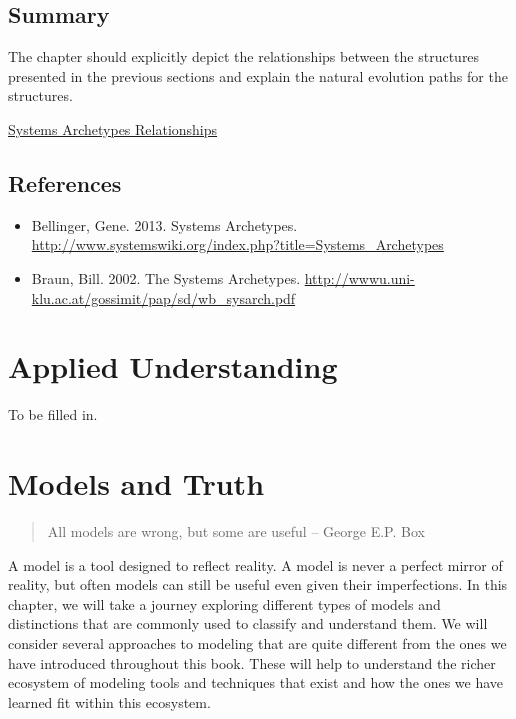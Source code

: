 \documentclass[]{memoir}
\begin{document}
\section{Summary}

The chapter should explicitly depict the relationships between the
structures presented in the previous sections and explain the natural
evolution paths for the structures.

\href{http://insightmaker.com/insight/538}{Systems Archetypes
Relationships}

\section{References}

\begin{itemize}
\itemsep1pt\parskip0pt
\item
  Bellinger, Gene. 2013. Systems Archetypes.
  \url{http://www.systemswiki.org/index.php?title=Systems_Archetypes}
\item
  Braun, Bill. 2002. The Systems Archetypes.
  \url{http://wwwu.uni-klu.ac.at/gossimit/pap/sd/wb_sysarch.pdf}
\end{itemize}

\chapter{Applied Understanding}

To be filled in.

\chapter{Models and Truth}

\begin{quote}
All models are wrong, but some are useful -- George E.P. Box
\end{quote}

A model is a tool designed to reflect reality. A model is never a
perfect mirror of reality, but often models can still be useful even
given their imperfections. In this chapter, we will take a journey
exploring different types of models and distinctions that are commonly
used to classify and understand them. We will consider several
approaches to modeling that are quite different from the ones we have
introduced throughout this book. These will help to understand the
richer ecosystem of modeling tools and techniques that exist and how the
ones we have learned fit within this ecosystem.
\end{document}
